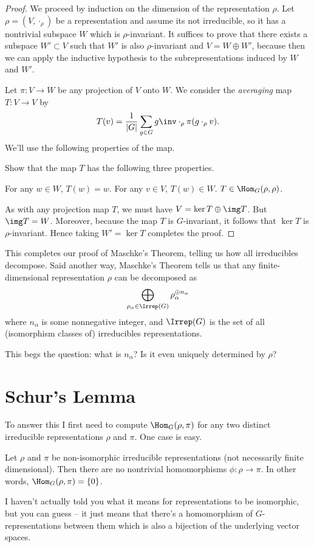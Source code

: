 \begin{proof}
	We proceed by induction on the dimension of the representation $\rho$.
	Let $\rho = (V, \cdot_\rho)$ be a representation and assume its not irreducible, so it has a nontrivial subspace $W$ which is $\rho$-invariant.
	It suffices to prove that there exists a subspace $W' \subset V$ such that $W'$ is also $\rho$-invariant and $V = W \oplus W'$, because then we can apply the inductive hypothesis to the subrepresentations induced by $W$ and $W'$.

	Let $\pi : V \to W$ be any projection of $V$ onto $W$.
	We consider the \emph{averaging} map $T : V \to V$ by
	\[ 
		T(v) = \frac{1}{\left\lvert G \right\rvert}
		\sum_{g \in G} g\inv \cdot_\rho \pi(g \cdot_\rho v).
	\]
	We'll use the following properties of the map.
	\begin{exercise}
		Show that the map $T$ has the following three properties.
		\begin{itemize}
			\ii For any $w \in W$, $T(w) = w$.
			\ii For any $v \in V$, $T(w) \in W$.
			\ii $T \in \Hom_G(\rho, \rho)$.
		\end{itemize}
	\end{exercise}
	As with any projection map $T$, we must have $V = \ker T \oplus \img T$.
	But $\img T = W$.
	Moreover, because the map $T$ is $G$-invariant, it follows that $\ker T$ is $\rho$-invariant.
	Hence taking $W' = \ker T$ completes the proof.
\end{proof}

This completes our proof of Maschke's Theorem, telling us how all irreducibles decompose.
Said another way, Maschke's Theorem tells us that any finite-dimensional representation $\rho$ can be decomposed as
\[
	\bigoplus_{\rho_\alpha \in \Irrep(G)} \rho_{\alpha}^{\oplus n_\alpha}
\]
where $n_\alpha$ is some nonnegative integer, and $\Irrep(G)$ is the set of all (isomorphism classes of) irreducibles representations.

This begs the question: what is $n_\alpha$?
Is it even uniquely determined by $\rho$?

\section{Schur's Lemma}
To answer this I first need to compute $\Hom_G(\rho, \pi)$ for any two distinct irreducible representations $\rho$ and $\pi$.
One case is easy.
\begin{lemma}
	Let $\rho$ and $\pi$ be non-isomorphic irreducible representations (not necessarily finite dimensional).
	Then there are no nontrivial homomorphisms $\phi : \rho \to \pi$.
	In other words, $\Hom_G(\rho, \pi) = \{0\}$.
\end{lemma}
I haven't actually told you what it means for representations to be isomorphic, but you can guess -- it just means
that there's a homomorphism of $G$-representations between them which is also a bijection of the underlying vector spaces.

